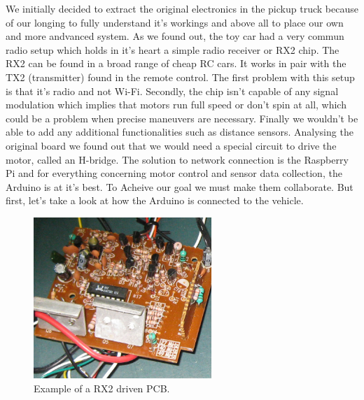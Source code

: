\documentclass[a4paper,11pt]{report}
\begin{document}
{\begin{enumerate}
We initially decided to extract the original electronics in the pickup truck
because of our longing to fully understand it's workings and above all to
place our own and more andvanced system.
As we found out, the toy car had a very commun radio setup which holds in it's
heart a simple radio receiver or RX2 chip. The RX2 can be found in a broad
range of cheap RC cars. It works in pair with the TX2 (transmitter) found in
the remote control. The first problem with this setup is that it's radio and
not Wi-Fi. Secondly, the chip isn't capable of any signal modulation which
implies that motors run full speed or don't spin at all, which could be a
problem when precise maneuvers are necessary. Finally we wouldn't
be able to add any additional functionalities such as distance
sensors. Analysing the original board we found out that we would need a
special circuit to drive the motor, called an H-bridge.
The solution to network connection is the Raspberry Pi and for everything
concerning  motor control and sensor data collection, the Arduino is at it's
best. To Acheive our goal we must make them collaborate. But first, let's take
a look at how the Arduino is connected to the vehicle.   

\begin{figure}[h]
\centering
\includegraphics[width=0.6\textwidth]{rx2_ex2.jpg}
    \caption[Exemple de plaque RX2]{\label{rx2.2}Example of a RX2 driven PCB.}
\end{figure}


\end{enumerate}}
\end{document}
